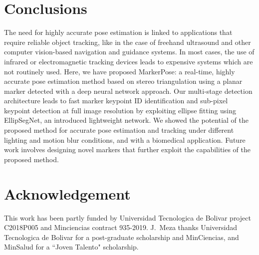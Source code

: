 \documentclass[final]{cvpr}
\begin{document}
\section{Conclusions}
The need for highly accurate pose estimation is linked to applications that require reliable object tracking, like in the case of freehand ultrasound and other computer vision-based navigation and guidance systems. In most cases, the use of infrared or electromagnetic tracking devices leads to expensive systems which are not routinely used. Here, we have proposed MarkerPose: a real-time, highly accurate pose estimation method based on stereo triangulation using a planar marker detected with a deep neural network approach. Our multi-stage detection architecture leads to fast marker keypoint ID identification and sub-pixel keypoint detection at full image resolution by exploiting ellipse fitting using EllipSegNet, an introduced lightweight network. We showed the potential of the proposed method for accurate pose estimation and tracking under different lighting and motion blur conditions, and with a biomedical application. Future work involves designing novel markers that further exploit the capabilities of the proposed method.


\section*{Acknowledgement}
This work has been partly funded by Universidad Tecnologica de Bolivar project C2018P005 and Minciencias contract 935-2019. J.~Meza thanks Universidad Tecnologica de Bolivar for a post-graduate scholarship and MinCiencias, and MinSalud for a ``Joven Talento" scholarship. 


{\small

% 

}
\end{document}

